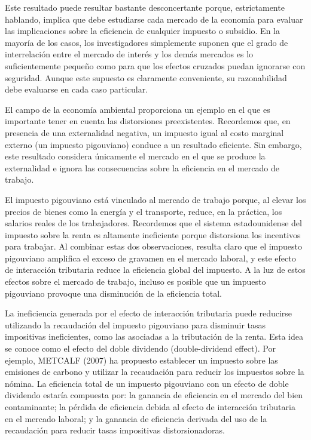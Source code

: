 \documentclass[10pt,a4paper]{article}
\begin{document}
Este resultado puede resultar bastante desconcertante porque, estrictamente hablando, implica que debe estudiarse cada mercado de la economía para evaluar las implicaciones sobre la eficiencia de cualquier impuesto o subsidio. En la mayoría de los casos, los investigadores simplemente suponen que el grado de interrelación entre el mercado de interés y los demás mercados es lo suficientemente pequeño como para que los efectos cruzados puedan ignorarse con seguridad. Aunque este supuesto es claramente conveniente, su razonabilidad debe evaluarse en cada caso particular.

El campo de la economía ambiental proporciona un ejemplo en el que es importante tener en cuenta las distorsiones preexistentes. Recordemos que, en presencia de una externalidad negativa, un impuesto igual al costo marginal externo (un impuesto pigouviano) conduce a un resultado eficiente. Sin embargo, este resultado considera únicamente el mercado en el que se produce la externalidad e ignora las consecuencias sobre la eficiencia en el mercado de trabajo.

El impuesto pigouviano está vinculado al mercado de trabajo porque, al elevar los precios de bienes como la energía y el transporte, reduce, en la práctica, los salarios reales de los trabajadores. Recordemos que el sistema estadounidense del impuesto sobre la renta es altamente ineficiente porque distorsiona los incentivos para trabajar. Al combinar estas dos observaciones, resulta claro que el impuesto pigouviano amplifica el exceso de gravamen en el mercado laboral, y este efecto de interacción tributaria reduce la eficiencia global del impuesto. A la luz de estos efectos sobre el mercado de trabajo, incluso es posible que un impuesto pigouviano provoque una disminución de la eficiencia total.

La ineficiencia generada por el efecto de interacción tributaria puede reducirse utilizando la recaudación del impuesto pigouviano para disminuir tasas impositivas ineficientes, como las asociadas a la tributación de la renta. Esta idea se conoce como el efecto del doble dividendo (double-dividend effect). Por ejemplo, METCALF (2007) ha propuesto establecer un impuesto sobre las emisiones de carbono y utilizar la recaudación para reducir los impuestos sobre la nómina. La eficiencia total de un impuesto pigouviano con un efecto de doble dividendo estaría compuesta por: la ganancia de eficiencia en el mercado del bien contaminante; la pérdida de eficiencia debida al efecto de interacción tributaria en el mercado laboral; y la ganancia de eficiencia derivada del uso de la recaudación para reducir tasas impositivas distorsionadoras.
\end{document}
